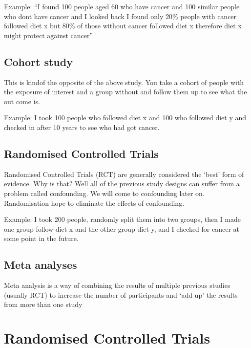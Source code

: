 \documentclass[
]{book}
\theoremstyle{definition}
\theoremstyle{definition}
\theoremstyle{definition}
\theoremstyle{definition}
\theoremstyle{remark}
\begin{document}
Example: ``I found 100 people aged 60 who have cancer and 100 similar people who dont have cancer and I looked back I found only 20\% people with cancer followed diet x but 80\% of those without cancer followed diet x therefore diet x might protect against cancer''

\hypertarget{cohort-study}{%
\section{Cohort study}\label{cohort-study}}

This is kindof the opposite of the above study. You take a cohort of people with the exposure of interest and a group without and follow them up to see what the out come is.

Example: I took 100 people who followed diet x and 100 who followed diet y and checked in after 10 years to see who had got cancer.

\hypertarget{randomised-controlled-trials}{%
\section{Randomised Controlled Trials}\label{randomised-controlled-trials}}

Randomised Controlled Trials (RCT) are generally considered the `best' form of evidence. Why is that? Well all of the previous study designs can suffer from a problem called confounding. We will come to confounding later on. Randomisation hope to eliminate the effects of confounding.

Example: I took 200 people, randomly split them into two groups, then I made one group follow diet x and the other group diet y, and I checked for cancer at some point in the future.

\hypertarget{meta-analyses}{%
\section{Meta analyses}\label{meta-analyses}}

Meta analysis is a way of combining the results of multiple previous studies (usually RCT) to increase the number of participants and `add up' the results from more than one study

\hypertarget{randomised-controlled-trials-1}{%
\chapter{Randomised Controlled Trials}\label{randomised-controlled-trials-1}}
\end{document}
